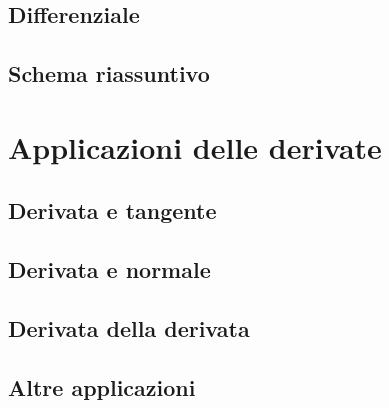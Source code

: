 \subsection{Differenziale}
\label{subsec:differenziazione_differenziale}

\subsection{Schema riassuntivo}
\label{subsec:differenziazione_schemaderivate}

\section{Applicazioni delle derivate}
\label{sec:differenziazione_applicazioni}

\subsection{Derivata e tangente}
\label{subsec:differenziazione_derivataetangente}

\subsection{Derivata e normale}
\label{subsec:differenziazione_derivataenormale}

\subsection{Derivata della derivata}
\label{subsec:differenziazione_derivataseconda}

\subsection{Altre applicazioni}
\label{subsec:differenziazione_altreapplicazioni}

